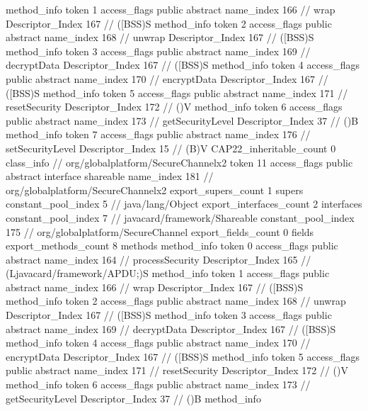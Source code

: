 {{{{{				}
				method_info {
					token	1
					access_flags	public abstract
					name_index	166		// wrap
					Descriptor_Index	167		// ([BSS)S
				}
				method_info {
					token	2
					access_flags	public abstract
					name_index	168		// unwrap
					Descriptor_Index	167		// ([BSS)S
				}
				method_info {
					token	3
					access_flags	public abstract
					name_index	169		// decryptData
					Descriptor_Index	167		// ([BSS)S
				}
				method_info {
					token	4
					access_flags	public abstract
					name_index	170		// encryptData
					Descriptor_Index	167		// ([BSS)S
				}
				method_info {
					token	5
					access_flags	public abstract
					name_index	171		// resetSecurity
					Descriptor_Index	172		// ()V
				}
				method_info {
					token	6
					access_flags	public abstract
					name_index	173		// getSecurityLevel
					Descriptor_Index	37		// ()B
				}
				method_info {
					token	7
					access_flags	public abstract
					name_index	176		// setSecurityLevel
					Descriptor_Index	15		// (B)V
				}
			}
			CAP22_inheritable_count	0
		}
		class_info {		// org/globalplatform/SecureChannelx2
			token	11
			access_flags	public abstract interface shareable
			name_index	181		// org/globalplatform/SecureChannelx2
			export_supers_count	1
			supers {
				constant_pool_index	5		// java/lang/Object
			}
			export_interfaces_count	2
			interfaces {
				constant_pool_index	7		// javacard/framework/Shareable
				constant_pool_index	175		// org/globalplatform/SecureChannel
			}
			export_fields_count	0
			fields {
			}
			export_methods_count	8
			methods {
				method_info {
					token	0
					access_flags	public abstract
					name_index	164		// processSecurity
					Descriptor_Index	165		// (Ljavacard/framework/APDU;)S
				}
				method_info {
					token	1
					access_flags	public abstract
					name_index	166		// wrap
					Descriptor_Index	167		// ([BSS)S
				}
				method_info {
					token	2
					access_flags	public abstract
					name_index	168		// unwrap
					Descriptor_Index	167		// ([BSS)S
				}
				method_info {
					token	3
					access_flags	public abstract
					name_index	169		// decryptData
					Descriptor_Index	167		// ([BSS)S
				}
				method_info {
					token	4
					access_flags	public abstract
					name_index	170		// encryptData
					Descriptor_Index	167		// ([BSS)S
				}
				method_info {
					token	5
					access_flags	public abstract
					name_index	171		// resetSecurity
					Descriptor_Index	172		// ()V
				}
				method_info {
					token	6
					access_flags	public abstract
					name_index	173		// getSecurityLevel
					Descriptor_Index	37		// ()B
				}
				method_info {
}}}}}
